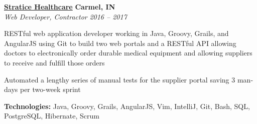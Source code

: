 %
    \headerrow
        {\textbf{\href{https://www.straticehealthcare.com/}{Stratice Healthcare}}}
        {\textbf{Carmel, IN}}
    \\
    \headerrow
        {\emph{Web Developer, Contractor}}
        {\emph{2016 -- 2017}}
    \begin{itemize*}
        \item RESTful web application developer working in Java, Groovy, Grails, and AngularJS using Git to build two
            web portals and a RESTful API allowing doctors to electronically order durable medical equipment and
            allowing suppliers to receive and fulfill those orders
        \item Automated a lengthy series of manual tests for the supplier portal saving 3 man-days per two-week sprint
    \end{itemize*}

    \hspace{1.0em}
        {\textbf{Technologies:} Java, Groovy, Grails, AngularJS, Vim, IntelliJ, Git, Bash, SQL, PostgreSQL, Hibernate, Scrum}
